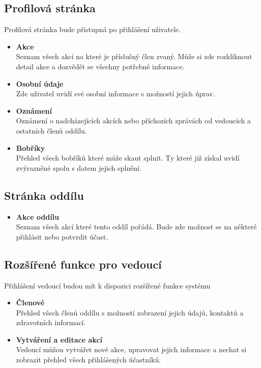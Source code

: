 \documentclass[twoside]{ctuthesis}
\begin{document}
\subsection{Profilová stránka}
Profilová stránka bude přístupná po přihlášení uživatele.
\begin{itemize}
    \item \textbf{Akce} \\
    Seznam všech akcí na které je příslušný člen zvaný. Může si zde rozkliknout detail akce a dozvědět se všechny potřebné informace.
    \item \textbf{Osobní údaje} \\
    Zde uživatel uvidí své osobní informace s možností jejich úprav.
    \item \textbf{Oznámení} \\
    Oznámení o nadcházejících akcích nebo příchozích zprávách od vedoucích a ostatních členů oddílu.
    \item \textbf{Bobříky} \\
    Přehled všech bobříků které může skaut splnit. Ty které již získal uvidí zvýrazněné spolu s datem jejich splnění.
\end{itemize}

\subsection{Stránka oddílu}

\begin{itemize}
    \item \textbf{Akce oddílu} \\
    Seznam všech akcí které tento oddíl pořádá. Bude zde možnost se na některé přihlásit nebo potvrdit účast.
\end{itemize}

\subsection{Rozšířené funkce pro vedoucí}
Přihlášení vedoucí budou mít k dispozici rozšířené funkce systému

\begin{itemize}
    \item \textbf{Členové} \\
    Přehled všech členů oddílu s možností zobrazení jejich údajů, kontaktů a zdravotních informací.  
    \item \textbf{Vytváření a editace akcí} \\
    Vedoucí můžou vytvářet nové akce, upravovat jejich informace a nechat si zobrazit přehled všech přihlášených účastníků.
\end{itemize}
\end{document}
